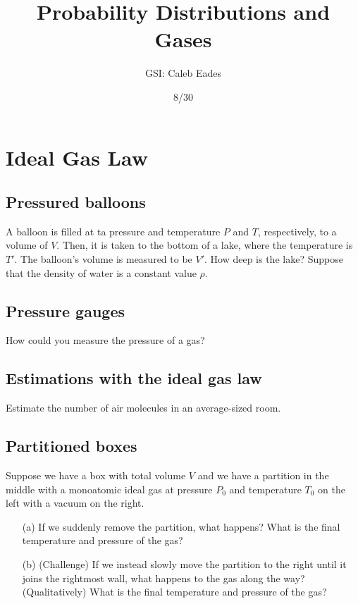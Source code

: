 \documentclass{article}
\begin{document}
	
\title{Probability Distributions and Gases}
\author{GSI: Caleb Eades}
\date{8/30}
\maketitle

\section{Ideal Gas Law}

\subsection{Pressured balloons}

A balloon is filled at ta pressure and temperature $P$ and $T$, respectively, to a volume of $V$. Then, it is taken to the bottom of a lake, where the temperature is $T'$. The balloon's volume is measured to be $V'$. How deep is the lake? Suppose that the density of water is a constant value $\rho$.

\subsection{Pressure gauges}

How could you measure the pressure of a gas?

\subsection{Estimations with the ideal gas law}

Estimate the number of air molecules in an average-sized room.

\subsection{Partitioned boxes}

Suppose we have a box with total volume $V$ and we have a partition in the middle with a monoatomic ideal gas at pressure $P_0$ and temperature $T_0$ on the left with a vacuum on the right.
\begin{itemize}
	\item[(a)] If we suddenly remove the partition, what happens? What is the final temperature and pressure of the gas?
	\item[(b)] (Challenge) If we instead slowly move the partition to the right until it joins the rightmost wall, what happens to the gas along the way? (Qualitatively) What is the final temperature and pressure of the gas?
\end{itemize}
\end{document}
